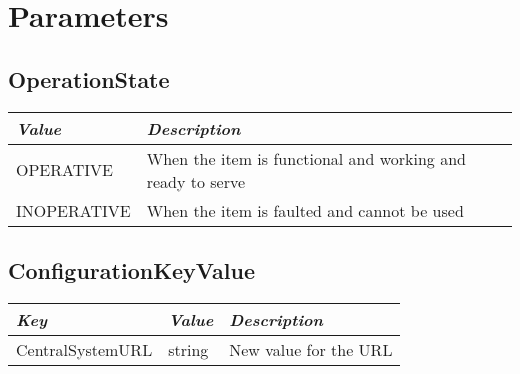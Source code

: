 \section{Parameters}

\subsection{OperationState}
\label{types:OperationState}

\begin{tabularx}{\linewidth}{ l X }
  \hline
  \textit{Value} & \textit{Description} \\
  \hline \hline
  OPERATIVE 		& When the item is functional and working and ready to serve \\
  INOPERATIVE 	& When the item is faulted and cannot be used \\
\end{tabularx}

\subsection{ConfigurationKeyValue}
\label{types:ConfigurationKeyValue}

\begin{tabularx}{\linewidth}{ l l X }
  \hline
  \textit{Key} & \textit{Value} &\textit{Description} \\
  \hline \hline
  CentralSystemURL 	& string 	& New value for the URL \\
\end{tabularx}